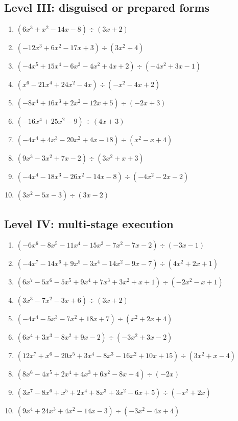 \documentclass[11pt,oneside]{book}
\begin{document}
\subsection*{Level III: disguised or prepared forms}
\begin{enumerate}[leftmargin=*,label=\textbf{\arabic*.},itemsep=0.65\baselineskip]
\item $\displaystyle (6 x^{3} + x^{2} - 14 x - 8)\div(3 x + 2)$
\item $\displaystyle (- 12 x^{3} + 6 x^{2} - 17 x + 3)\div(3 x^{2} + 4)$
\item $\displaystyle (- 4 x^{5} + 15 x^{4} - 6 x^{3} - 4 x^{2} + 4 x + 2)\div(- 4 x^{2} + 3 x - 1)$
\item $\displaystyle (x^{6} - 21 x^{4} + 24 x^{2} - 4 x)\div(- x^{2} - 4 x + 2)$
\item $\displaystyle (- 8 x^{4} + 16 x^{3} + 2 x^{2} - 12 x + 5)\div(- 2 x + 3)$
\item $\displaystyle (- 16 x^{4} + 25 x^{2} - 9)\div(4 x + 3)$
\item $\displaystyle (- 4 x^{4} + 4 x^{3} - 20 x^{2} + 4 x - 18)\div(x^{2} - x + 4)$
\item $\displaystyle (9 x^{3} - 3 x^{2} + 7 x - 2)\div(3 x^{2} + x + 3)$
\item $\displaystyle (- 4 x^{4} - 18 x^{3} - 26 x^{2} - 14 x - 8)\div(- 4 x^{2} - 2 x - 2)$
\item $\displaystyle (3 x^{2} - 5 x - 3)\div(3 x - 2)$
\end{enumerate}
\subsection*{Level IV: multi-stage execution}
\begin{enumerate}[leftmargin=*,label=\textbf{\arabic*.},itemsep=0.65\baselineskip]
\item $\displaystyle (- 6 x^{6} - 8 x^{5} - 11 x^{4} - 15 x^{3} - 7 x^{2} - 7 x - 2)\div(- 3 x - 1)$
\item $\displaystyle (- 4 x^{7} - 14 x^{6} + 9 x^{5} - 3 x^{4} - 14 x^{2} - 9 x - 7)\div(4 x^{2} + 2 x + 1)$
\item $\displaystyle (6 x^{7} - 5 x^{6} - 5 x^{5} + 9 x^{4} + 7 x^{3} + 3 x^{2} + x + 1)\div(- 2 x^{2} - x + 1)$
\item $\displaystyle (3 x^{3} - 7 x^{2} - 3 x + 6)\div(3 x + 2)$
\item $\displaystyle (- 4 x^{4} - 5 x^{3} - 7 x^{2} + 18 x + 7)\div(x^{2} + 2 x + 4)$
\item $\displaystyle (6 x^{4} + 3 x^{3} - 8 x^{2} + 9 x - 2)\div(- 3 x^{2} + 3 x - 2)$
\item $\displaystyle (12 x^{7} + x^{6} - 20 x^{5} + 3 x^{4} - 8 x^{3} - 16 x^{2} + 10 x + 15)\div(3 x^{2} + x - 4)$
\item $\displaystyle (8 x^{6} - 4 x^{5} + 2 x^{4} + 4 x^{3} + 6 x^{2} - 8 x + 4)\div(- 2 x)$
\item $\displaystyle (3 x^{7} - 8 x^{6} + x^{5} + 2 x^{4} + 8 x^{3} + 3 x^{2} - 6 x + 5)\div(- x^{2} + 2 x)$
\item $\displaystyle (9 x^{4} + 24 x^{3} + 4 x^{2} - 14 x - 3)\div(- 3 x^{2} - 4 x + 4)$
\end{enumerate}
\end{document}

